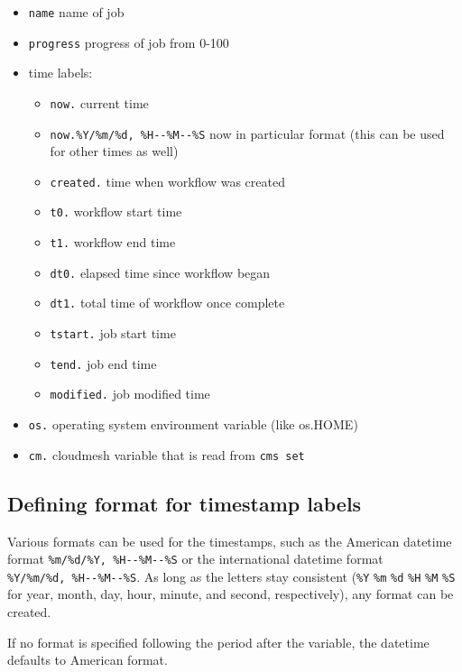 \begin{itemize}
\tightlist
\item
  \texttt{name} name of job
\item
  \texttt{progress} progress of job from 0-100
\item
  time labels:

  \begin{itemize}
  \tightlist
  \item
    \texttt{now.} current time
  \item
    \texttt{now.\%Y/\%m/\%d,\ \%H-\/-\%M-\/-\%S} now in particular
    format (this can be used for other times as well)
  \item
    \texttt{created.} time when workflow was created
  \item
    \texttt{t0.} workflow start time
  \item
    \texttt{t1.} workflow end time
  \item
    \texttt{dt0.} elapsed time since workflow began
  \item
    \texttt{dt1.} total time of workflow once complete
  \item
    \texttt{tstart.} job start time
  \item
    \texttt{tend.} job end time
  \item
    \texttt{modified.} job modified time
  \end{itemize}
\item
  \texttt{os.} operating system environment variable (like os.HOME)
\item
  \texttt{cm.} cloudmesh variable that is read from \texttt{cms\ set}
\end{itemize}

\subsection{Defining format for timestamp
labels}\label{defining-format-for-timestamp-labels}

Various formats can be used for the timestamps, such as the American
datetime format \texttt{\%m/\%d/\%Y,\ \%H-\/-\%M-\/-\%S} or the
international datetime format \texttt{\%Y/\%m/\%d,\ \%H-\/-\%M-\/-\%S}.
As long as the letters stay consistent (\texttt{\%Y} \texttt{\%m}
\texttt{\%d} \texttt{\%H} \texttt{\%M} \texttt{\%S} for year, month,
day, hour, minute, and second, respectively), any format can be created.

If no format is specified following the period after the variable, the
datetime defaults to American format.


